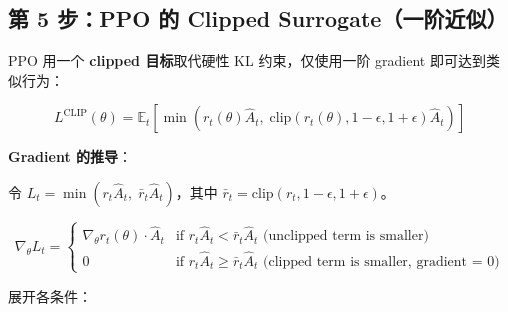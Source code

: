 \subsection{第 5 步：PPO 的 Clipped Surrogate（一阶近似）}
\label{step-5-ppos-clipped-surrogate-first-order-approximation}

PPO 用一个\textbf{ clipped 目标}取代硬性 KL 约束，仅使用一阶 gradient 即可达到类似行为：

\begin{equation}
\boxed{L^{\text{CLIP}}(\theta) = \mathbb{E}_t\left[\min\!\left(r_t(\theta)\hat{A}_t,\;\text{clip}(r_t(\theta), 1{-}\epsilon, 1{+}\epsilon)\hat{A}_t\right)\right]}
\end{equation}

\textbf{Gradient 的推导}：

令 $L_t = \min(r_t \hat{A}_t,\; \bar{r}_t \hat{A}_t)$，其中 $\bar{r}_t = \text{clip}(r_t, 1{-}\epsilon, 1{+}\epsilon)$。

\begin{equation}
\nabla_\theta L_t = \begin{cases}
\nabla_\theta r_t(\theta) \cdot \hat{A}_t & \text{if } r_t \hat{A}_t < \bar{r}_t \hat{A}_t \text{ (unclipped term is smaller)} \\
0 & \text{if } r_t \hat{A}_t \geq \bar{r}_t \hat{A}_t \text{ (clipped term is smaller, gradient = 0)}
\end{cases}
\end{equation}

展开各条件：

